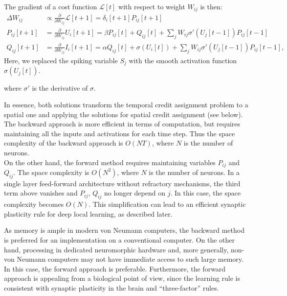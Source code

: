 \documentclass[journal,onecolumn,11pt]{IEEEtran}
\begin{document}
\begin{enumerate}
The gradient of a cost function $\mathcal{L}[t]$ with respect to weight $W_{ij}$ is then:
\[
\begin{split}
 \Delta {W_{ij}} &\propto \frac{\partial }{\partial W_{ij}} \mathcal{L}[t+1] = \delta_i[t+1] P_{ij}[t+1]\\
 P_{ij}[t+1]     &= \frac{\partial} {\partial W_{ij}}  U_i[t+1] = \beta P_{ij}[t] + Q_{ij}[t] + \sum_j W_{ij} \sigma'(U_j[t-1]) P_{ij}[t-1]\\
 Q_{ij}[t+1]     &= \frac{\partial} {\partial W_{ij}}  I_i[t+1] = \alpha Q_{ij}[t] + \sigma(U_i[t]) + \sum_j W_{ij} \sigma'(U_j[t-1]) P_{ij}[t-1],
\end{split}
\]
Here, we replaced the spiking variable $S_j$ with the smooth activation function $\sigma(U_j[t])$.

where $\sigma'$ is the derivative of $\sigma$.
\end{enumerate}


In essence, both solutions transform the temporal credit assignment problem to a spatial one and applying the solutions for spatial credit assignment (see below).
The backward approach is more efficient in terms of computation, but requires maintaining all the inputs and activations for each time step.
Thus the space complexity of the backward approach is $O(N T)$, where $N$ is the number of neurons.\\
On the other hand, the forward method requires maintaining variables $P_{ij}$ and $Q_{ij}$.
The space complexity is $O(N^2)$, where $N$ is the number of neurons.
In a single layer feed-forward architecture without refractory mechanisms, the third term above vanishes and $P_{ij}$, $Q_{ij}$ no longer depend on $j$.
In this case, the space complexity becomes $O(N)$.
This simplification can lead to an efficient synaptic plasticity rule for deep local learning, as described later.

As memory is ample in modern von Neumann computers, the backward method is preferred for an implementation on a conventional computer.
On the other hand, processing in dedicated neuromorphic hardware and, more generally, non-von Neumann computers may not have immediate access to such large memory.
In this case, the forward approach is preferable.
Furthermore, the forward approach is appealing from a biological point of view, since the learning rule is consistent with synaptic plasticity in the brain and ``three-factor'' rules.
\end{document}
